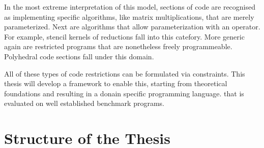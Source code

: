     In the most extreme interpretation of this model, sections of code are
    recognised as implementing specific algorithms, like matrix multiplications,
    that are merely parameterized.
    Next are algorithms that allow parameterization with an operator.
    For example, stencil kernels of reductions fall into this catefory.
    More generic again are restricted programs that are nonetheless freely
    programmeable.
    Polyhedral code sections fall under this domain.

    All of these types of code restrictions can be formulated via constraints.
    This thesis will develop a framework to enable this, starting from
    theoretical foundations and resulting in a donain specific programming
    language. that is evaluated on well established benchmark programs.






\newpage
\section{Structure of the Thesis}


